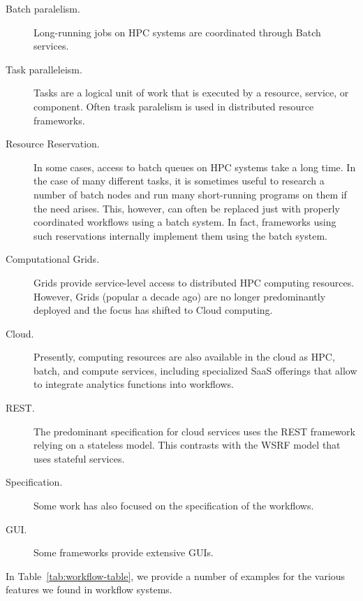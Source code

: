 \documentclass[sigplan,screen]{acmart}
\begin{document}
\begin{description}

\item[Batch paralelism.] Long-running jobs on HPC systems are coordinated through
Batch services.

\item[Task paralleleism.] Tasks are a logical unit of work that is
executed by a resource, service, or component. Often trask paralelism
is used in distributed resource frameworks.  

\item[Resource Reservation.] In some cases, access to batch queues on
HPC systems take a long time. In the case of many different tasks, it
is sometimes useful to research a number of batch nodes and run many
short-running programs on them if the need arises. This, however, can
often be replaced just with properly coordinated workflows using a
batch system. In fact, frameworks using such reservations internally
implement them using the batch system.

\item[Computational Grids.] Grids provide service-level access to
distributed HPC computing resources. However, Grids (popular a decade
ago) are no longer predominantly deployed and the focus has shifted to
Cloud computing.

\item[Cloud.] Presently, computing resources are also available in
the cloud as HPC, batch, and compute services, including specialized
SaaS offerings that allow to integrate analytics functions into
workflows.

\item[REST.] The predominant specification for cloud services uses the
REST framework relying on a stateless model. This contrasts with the
WSRF model that uses stateful services.

\item[Specification.] Some work has also focused on the specification
of the workflows.

\item[GUI.] Some frameworks provide extensive GUIs.


\end{description}

In Table~\ref{tab:workflow-table}, we provide a number of examples for
the various features we found in workflow systems.
\end{document}
